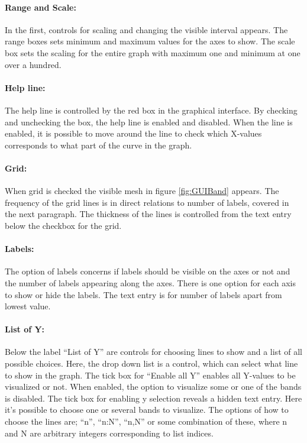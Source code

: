 
\paragraph{Range and Scale: }
In the first, controls for scaling and changing the visible interval appears. The range boxes sets minimum and maximum values for the axes to show. The scale box sets the scaling for the entire graph with maximum one and minimum at one over a hundred.
\paragraph{Help line: }
The help line is controlled by the red box in the graphical interface. By checking and unchecking the box, the help line is enabled and disabled. When the line is enabled, it is possible to move around the line to check which X-values corresponds to what part of the curve in the graph.
\paragraph{Grid: }
When grid is checked the visible mesh in figure \ref{fig:GUIBand} appears. The frequency of the grid lines is in direct relations to number of labels, covered in the next paragraph. The thickness of the lines is controlled from the text entry below the checkbox for the grid.
\paragraph{Labels: }
The option of labels concerns if labels should be visible on the axes or not and the number of labels appearing along the axes. There is one option for each axis to show or hide the labels. The text entry is for number of labels apart from lowest value.
\paragraph{List of Y: }
Below the label ``List of Y'' are controls for choosing lines to show and a list of all possible choices. Here, the drop down list is a control, which can select what line to show in the graph. The tick box for ``Enable all Y'' enables all Y-values to be visualized or not. When enabled, the option to visualize some or one of the bands is disabled. 
The tick box for enabling y selection reveals a hidden text entry. Here it's possible to choose one or several bands to visualize. The options of how to choose the lines are; ``n'', ``n:N'', ``n,N'' or some combination of these, where n and N are arbitrary integers corresponding to list indices.

